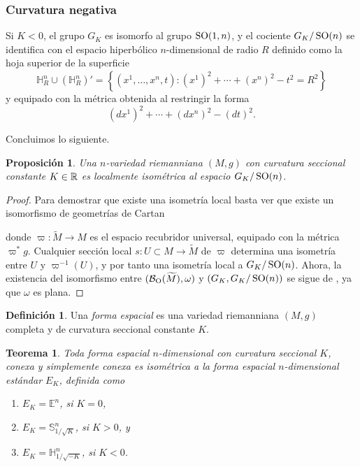 \documentclass[11pt,a4paper]{amsbook}
\newtheorem{thm}[subsection]{Teorema}
\newtheorem{prop}[subsection]{Proposición}
\theoremstyle{remark} \newtheorem{rmk}[subsection]{Observación}
\theoremstyle{definition} \newtheorem{defn}[subsection]{Definición}
\theoremstyle{definition} \newtheorem{ex}[subsection]{Ejemplo}
\theoremstyle{definition} \newtheorem{ej}[subsection]{Ejercicio}
\begin{document}
\subsubsection{Curvatura negativa} Si $K<0$, el grupo $G_K$ es isomorfo al grupo $\operatorname{SO}(1,n)$, y el cociente $G_K/\operatorname{SO}(n)$ se identifica con el espacio hiperbólico $n$-dimensional de radio $R$ definido como la hoja superior de la superficie
\begin{equation*}
\mathbb{H}^n_R \cup (\mathbb{H}^n_R)'=  \left\{ (x^1,\dots,x^n,t): (x^1)^2 + \cdots + (x^n)^2 - t^2 = R^2 \right\}
\end{equation*}
y equipado con la métrica obtenida al restringir la forma
\begin{equation*}
  (dx^1)^2 + \cdots + (dx^n)^2 - (dt)^2 .
\end{equation*}

Concluimos lo siguiente.

\begin{prop}
Una $n$-variedad riemanniana $(M,g)$ con curvatura seccional constante $K\in \mathbb R$ es localmente isométrica al espacio $G_K/\operatorname{SO}(n)$.
\end{prop}

\begin{proof}
  Para demostrar que existe una isometría local basta ver que existe un isomorfismo de geometrías de Cartan
  \begin{center}
  \end{center}
donde $\varpi:\widetilde{M}\rightarrow M$ es el espacio recubridor universal, equipado con la métrica $\varpi^* g$. Cualquier sección local $s:U\subset M\rightarrow \tilde{M}$ de $\varpi$ determina una isometría entre $U$ y $\varpi^{-1}(U)$, y por tanto una isometría local a $G_K/\operatorname{SO}(n)$. Ahora, la existencia del isomorfismo entre $(\mathcal B_{\operatorname{O}}(\widetilde{M}),\omega)$ y $(G_K,G_K/\operatorname{SO}(n))$ se sigue de , ya que $\omega$ es plana.
\end{proof}

\begin{defn}
Una \emph{forma espacial} es una variedad riemanniana $(M,g)$ completa y de curvatura seccional constante $K$.
\end{defn}

\begin{thm}
  Toda forma espacial $n$-dimensional con curvatura seccional $K$, conexa y simplemente conexa es isométrica a la \emph{forma espacial $n$-dimensional estándar} $E_K$, definida como
  \begin{enumerate}
    \item $E_K=\mathbb{E}^n$, si $K=0$,
          \item $E_K=\mathbb{S}^n_{1/\sqrt{K}}$, si $K>0$, y
          \item $E_K=\mathbb{H}^n_{1/\sqrt{-K}}$, si $K<0$.
  \end{enumerate}
\end{thm}
\end{document}
